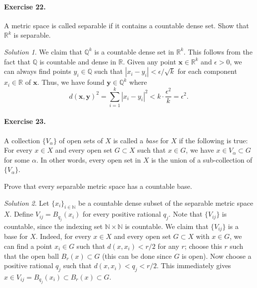 \documentclass[11pt]{report}
\def\R{\mathbb{R}}
\def\Q{\mathbb{Q}}
\def\N{\mathbb{N}}
\renewcommand\vec\boldsymbol
\def\vx{\vec{x}}
\def\vy{\vec{y}}
\theoremstyle{remark}
\newtheorem*{solution}{Solution}
\begin{document}
    \paragraph{Exercise 22.} A metric space is called separable if it contains a
    countable dense set. Show that $\R^k$ is separable.
    \begin{solution}
        We claim that $\Q^k$ is a countable dense set in $\R^k$. This follows from
        the fact that $\Q$ is countable and dense in $\R$. Given any point $\vx \in
        \R^k$ and $\epsilon > 0$, we can always find points $y_i \in \Q$ such that
        $|x_i - y_i| < \epsilon / \sqrt{k}$ for each component $x_i \in \R$ of
        $\vx$. Thus, we have found $\vy \in \Q^k$ where \[
            d(\vx, \vy)^2 = \sum_{i = 1}^k |x_i - y_i|^2 < k\cdot
            \frac{\epsilon^2}{k} = \epsilon^2.
        \] 
    \end{solution}

    \paragraph{Exercise 23.} A collection $\{V_\alpha\}$ of open sets of $X$ is
    called a \textit{base} for $X$ if the following is true: For every $x \in X$ and
    every open set $G \subset X$ such that $x \in G$, we have $x \in V_\alpha
    \subset G$ for some $\alpha$. In other words, every open set in $X$ is the union
    of a sub-collection of $\{V_\alpha\}$.

    Prove that every separable metric space has a countable base.
    \begin{solution}
        Let $\{x_i\}_{i \in \N}$ be a countable dense subset of the separable metric
        space $X$. Define $V_{ij} = B_{q_j}(x_i)$ for every positive rational $q_j$.
        Note that $\{V_{ij}\}$ is countable, since the indexing set $\N \times \N$
        is countable. We claim that $\{V_{ij}\}$ is a base for $X$. Indeed, for
        every $x \in X$ and every open set $G \subset X$ with $x \in G$, we can find
        a point $x_i \in G$ such that $d(x, x_i) < r/2$ for any $r$; choose this $r$
        such that the open ball $B_r(x) \subset G$ (this can be done since $G$ is
        open). Now choose a positive rational $q_j$ such that $d(x, x_i) < q_j < r/2$.
        This immediately gives $x \in V_{ij} = B_{q_j}(x_i) \subset B_r(x) \subset
        G$.
    \end{solution}
\end{document}

